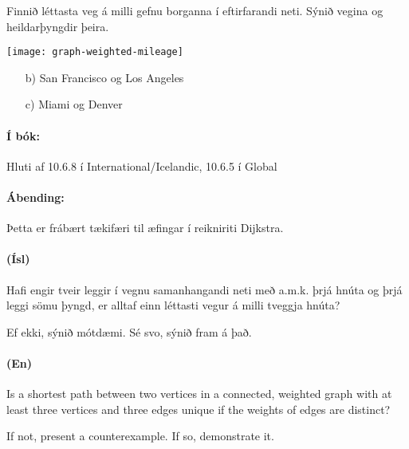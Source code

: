 \documentclass{article}
\begin{document}
\question Finnið léttasta veg á milli gefnu borganna í eftirfarandi neti. Sýnið vegina og heildarþyngdir þeira.

\begin{center}
\texttt{[image: graph-weighted-mileage]}
\end{center}

\begin{itemize}
 \item[b)] San Francisco og Los Angeles
 \item[c)] Miami og Denver
\end{itemize}

\paragraph{Í bók:} Hluti af 10.6.8 í International/Icelandic, 10.6.5 í Global

\paragraph{Ábending:} Þetta er frábært tækifæri til æfingar í reikniriti Dijkstra.

\question 

\paragraph{(Ísl)} Hafi engir tveir leggir í vegnu samanhangandi neti með a.m.k. þrjá hnúta og þrjá leggi sömu þyngd, er alltaf einn léttasti vegur á milli tveggja hnúta?

Ef ekki, sýnið mótdæmi. Sé svo, sýnið fram á það.

\paragraph{(En)} Is a shortest path between two vertices in a connected, weighted graph with at least three vertices and three edges unique if the weights of edges are distinct?

If not, present a counterexample. If so, demonstrate it.
\end{document}
